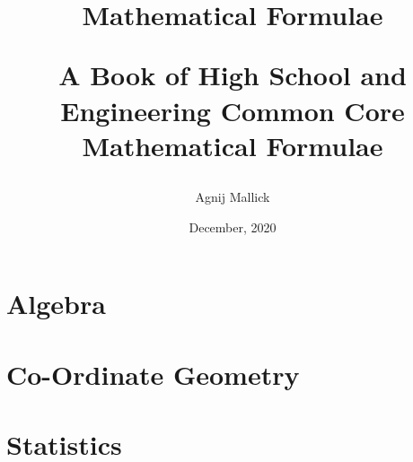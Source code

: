 \documentclass[openany, oneside]{book}
\title{Mathematical Formulae\\\begin{large}
A Book of High School and Engineering Common Core Mathematical Formulae
\end{large}}
\date{December, 2020}
\author{Agnij Mallick}
\begin{document}

\maketitle
{}
\tableofcontents
\newpage

\part{Algebra}


















\part{Co-Ordinate Geometry}




















\part{Statistics}






\end{document}
